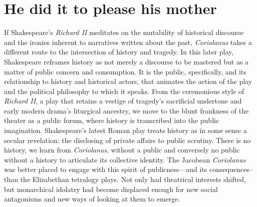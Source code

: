 \chapter{He did it to please his mother\label{ch:Coriolanus}}
If Shakespeare's \emph{Richard II} meditates on the mutability of historical discourse and the ironies inherent to narratives written about the past, \emph{Coriolanus} takes a different route to the intersection of history and tragedy.
In this later play, Shakespeare reframes history as not merely a discourse to be mastered but as a matter of public concern and consumption.
It is the public, specifically, and its relationship to history and historical actors, that animates the action of the play and the political philosophy to which it speaks.
From the ceremonious style of \emph{Richard II}, a play that retains a vestige of tragedy's sacrificial undertone and early modern drama's liturgical ancestry, we move to the blunt frankness of the theater as a public forum, where history is transcribed into the public imagination.
Shakespeare's latest Roman play treats history as in some sense a secular revelation: the disclosing of private affairs to public scrutiny.
There is no history, we learn from \emph{Coriolanus}, without a public and conversely no public without a history to articulate its collective identity.
The Jacobean \emph{Coriolanus} was better placed to engage with this spirit of publicness---and its consequences--than the Elizabethan tetralogy plays. Not only had theatrical interests shifted, but monarchical idolatry had become displaced enough for new social antagonisms and new ways of looking at them to emerge.

